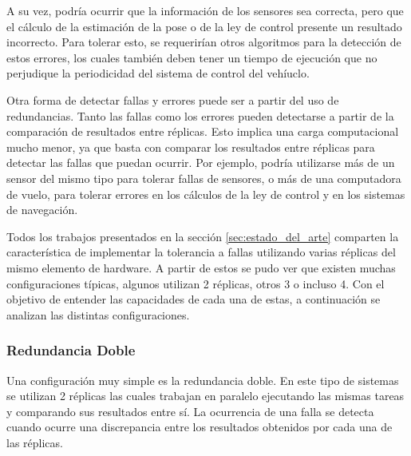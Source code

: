 A su vez, podría ocurrir que la información de los sensores sea correcta, pero que el cálculo de la estimación de la pose o de la ley de control presente un resultado incorrecto. Para tolerar esto, se requerirían otros algoritmos para la detección de estos errores, los cuales también deben tener un tiempo de ejecución que no perjudique la periodicidad del sistema de control del vehíuclo.

Otra forma de detectar fallas y errores puede ser a partir del uso de redundancias. %
Tanto las fallas como los errores pueden detectarse a partir de la comparación de resultados entre réplicas. Esto implica una carga computacional mucho menor, ya que basta con comparar los resultados entre réplicas para detectar las fallas que puedan ocurrir. 
Por ejemplo, podría utilizarse más de un sensor del mismo tipo para tolerar fallas de sensores, o más de una computadora de vuelo, para tolerar errores en los cálculos de la ley de control y en los sistemas de navegación.

Todos los trabajos presentados en la sección \ref{sec:estado_del_arte} comparten la característica de implementar la tolerancia a fallas utilizando varias réplicas del mismo elemento de hardware. A partir de estos se pudo ver que existen muchas configuraciones típicas, algunos utilizan 2 réplicas, otros 3 o incluso 4. Con el objetivo de entender las capacidades de cada una de estas, a continuación se analizan las distintas configuraciones.

\subsubsection{Redundancia Doble}

Una configuración muy simple es la redundancia doble. En este tipo de sistemas se utilizan 2 réplicas las cuales trabajan en paralelo ejecutando las mismas tareas y comparando sus resultados entre sí. La ocurrencia de una falla se detecta cuando ocurre una discrepancia entre los resultados obtenidos por cada una de las réplicas.

